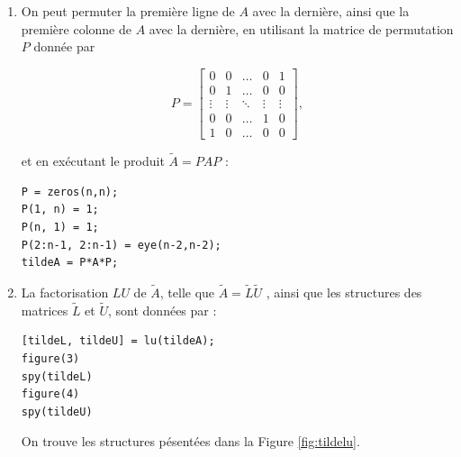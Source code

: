 \begin{enumerate}[label=\alph*)]
  \item On peut permuter la première ligne de $A$ avec la dernière, ainsi que la première colonne de $A$ avec la dernière, en utilisant la matrice de permutation $P$ donnée par
  
  
  \begin{equation*}
    P = \begin{bmatrix}
      0       & 0       & \dots   & 0       & 1 \\
      0       & 1       & \dots   & 0       & 0 \\
      \vdots  & \vdots  & \ddots  & \vdots  & \vdots \\
      0       & 0       & \dots   & 1       & 0 \\
      1       & 0       & \dots   & 0       & 0
        \end{bmatrix}
        ,
  \end{equation*}
  
  et en exécutant le produit $\tilde{A} = PAP$ : 
  
\begin{verbatim}
P = zeros(n,n);
P(1, n) = 1;
P(n, 1) = 1;
P(2:n-1, 2:n-1) = eye(n-2,n-2);
tildeA = P*A*P;
\end{verbatim} 

  \item La factorisation $LU$ de $\tilde{A}$, telle que $\tilde{A} = \tilde{L} \tilde{U}$ , ainsi que les structures des matrices $\tilde{L}$ et $\tilde{U}$, sont données par :
  
\begin{verbatim}
[tildeL, tildeU] = lu(tildeA);
figure(3)
spy(tildeL)
figure(4)
spy(tildeU)
\end{verbatim} 
    
   On trouve les structures pésentées dans la Figure \ref{fig:tildelu}.
   

\end{enumerate}
